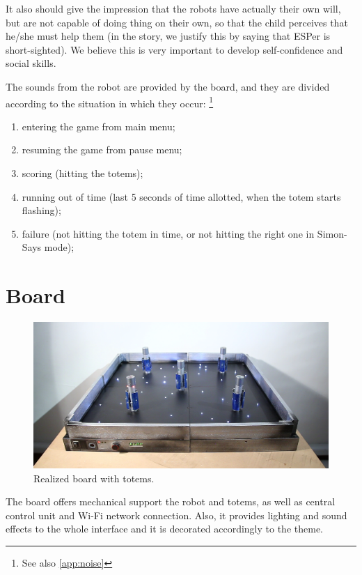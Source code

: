 \documentclass[a4paper,twoside]{book}
\begin{document}
It also should give the impression that the robots have actually their own will, but are not capable of doing thing on their own, so that the child perceives that he/she must help them (in the story, we justify this by saying that ESPer is short-sighted). We believe this is very important to develop self-confidence and social skills.

\beforelist* The sounds from the robot are provided by the board, and they are divided according to the situation in which they occur:
\footnote{See also \autoref{app:noise}}
\begin{enumerate}
\item entering the game from main menu;
\item resuming the game from pause menu;
\item scoring (hitting the totems);
\item running out of time (last 5 seconds of time allotted, when the totem starts flashing);
\item failure (not hitting the totem in time, or not hitting the right one in Simon-Says mode);
\end{enumerate}
\afterlist*

\section{Board}

\begin{figure}[h]
\includegraphics[width=\linewidth]{img/IMG_20160616_111353} 
\caption{Realized board with totems.}
\end{figure}

The board offers mechanical support the robot and totems, as well as central control unit and Wi-Fi network connection. Also, it provides lighting and sound effects to the whole interface and it is decorated accordingly to the theme.
\end{document}
